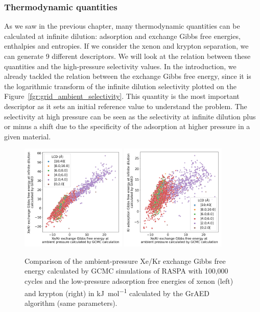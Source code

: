 \documentclass[main]{subfiles}
\begin{document}
\subsubsection{Thermodynamic quantities}

As we saw in the previous chapter, many thermodynamic quantities can be calculated at infinite dilution: adsorption and exchange Gibbs free energies, enthalpies and entropies. If we consider the xenon and krypton separation, we can generate 9 different descriptors. We will look at the relation between these quantities and the high-pressure selectivity values. In the introduction, we already tackled the relation between the exchange Gibbs free energy, since it is the logarithmic transform of the infinite dilution selectivity plotted on the Figure~\ref{fgr:grid_ambient_selectivity}. This quantity is the most important descriptor as it sets an initial reference value to understand the problem. The selectivity at high pressure can be seen as the selectivity at infinite dilution plus or minus a shift due to the specificity of the adsorption at higher pressure in a given material.


\begin{figure}[ht]
  \centering
    \includegraphics[width=0.45\textwidth]{figures/3-fastsim/G_2080_vs_G_Xe_grid_overview.jpg}
    \includegraphics[width=0.45\textwidth]{figures/3-fastsim/G_2080_vs_G_Kr_grid_overview.jpg}
    \caption{Comparison of the ambient-pressure Xe/Kr exchange Gibbs free energy calculated by GCMC simulations of RASPA with 100,000 cycles and the low-pressure adsorption free energies of xenon (left) and krypton (right) in \si{\kilo\joule\per\mole} calculated by the GrAED algorithm (same parameters).}\label{fgr:grid_comp_gibbs}
\end{figure}
\end{document}
